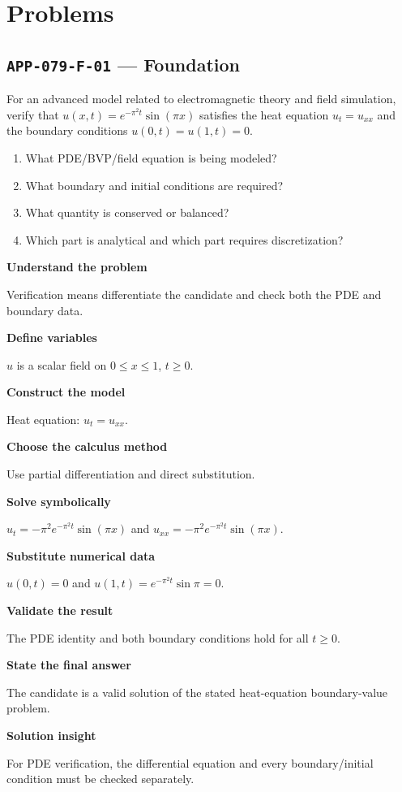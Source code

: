 \documentclass[11pt]{book}
\newcommand{\pid}[1]{\texttt{#1}}
\begin{document}
\section*{Problems}
\subsection*{\pid{APP-079-F-01} — Foundation}
\begin{problembox}
For an advanced model related to electromagnetic theory and field simulation, verify that $u(x,t)=e^{-\pi^2t}\sin(\pi x)$ satisfies the heat equation $u_t=u_{xx}$ and the boundary conditions $u(0,t)=u(1,t)=0$.
\end{problembox}
\begin{promptbox}\begin{enumerate}
\item What PDE/BVP/field equation is being modeled?
\item What boundary and initial conditions are required?
\item What quantity is conserved or balanced?
\item Which part is analytical and which part requires discretization?
\end{enumerate}\end{promptbox}
\begin{solutionbox}
\textbf{Understand the problem}\par Verification means differentiate the candidate and check both the PDE and boundary data.\par\medskip
\textbf{Define variables}\par $u$ is a scalar field on $0\le x\le1$, $t\ge0$.\par\medskip
\textbf{Construct the model}\par Heat equation: $u_t=u_{xx}$.\par\medskip
\textbf{Choose the calculus method}\par Use partial differentiation and direct substitution.\par\medskip
\textbf{Solve symbolically}\par $u_t=-\pi^2 e^{-\pi^2t}\sin(\pi x)$ and $u_{xx}=-\pi^2 e^{-\pi^2t}\sin(\pi x)$.\par\medskip
\textbf{Substitute numerical data}\par $u(0,t)=0$ and $u(1,t)=e^{-\pi^2t}\sin\pi=0$.\par\medskip
\textbf{Validate the result}\par The PDE identity and both boundary conditions hold for all $t\ge0$.\par\medskip
\textbf{State the final answer}\par The candidate is a valid solution of the stated heat-equation boundary-value problem.\par\medskip
\textbf{Solution insight}\par For PDE verification, the differential equation and every boundary/initial condition must be checked separately.\par\medskip
\end{solutionbox}
\end{document}
